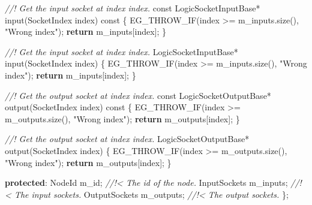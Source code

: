 \documentclass[
  12pt,
  british,
  paper=a4,
  twoside,
  titlepage=true,
  openright,
  abstract=on,
  toc=listofnumbered,
  numbers=noenddot,
  chapterprefix=true,
  headings=optiontohead,
  svgnames,
  dvipsnames]{scrreprt}
\newenvironment{Shaded}{}{}
\newcommand{\AttributeTok}[1]{\textcolor[rgb]{0.49,0.56,0.16}{#1}}
\newcommand{\CommentTok}[1]{\textcolor[rgb]{0.38,0.63,0.69}{\textit{#1}}}
\newcommand{\ControlFlowTok}[1]{\textcolor[rgb]{0.00,0.44,0.13}{\textbf{#1}}}
\newcommand{\KeywordTok}[1]{\textcolor[rgb]{0.00,0.44,0.13}{\textbf{#1}}}
\newcommand{\NormalTok}[1]{#1}
\newcommand{\OperatorTok}[1]{\textcolor[rgb]{0.40,0.40,0.40}{#1}}
\newcommand{\StringTok}[1]{\textcolor[rgb]{0.25,0.44,0.63}{#1}}
\newcommand{\VariableTok}[1]{\textcolor[rgb]{0.10,0.09,0.49}{#1}}
\begin{document}
\begin{Shaded}
\begin{Highlighting}[numbers=left,,]
    \CommentTok{//! Get the input socket at index \textasciigrave{}index\textasciigrave{}.}
    \AttributeTok{const}\NormalTok{ LogicSocketInputBase}\OperatorTok{*}\NormalTok{ input}\OperatorTok{(}\NormalTok{SocketIndex index}\OperatorTok{)} \AttributeTok{const}
    \OperatorTok{\{}
\NormalTok{        EG\_THROW\_IF}\OperatorTok{(}\NormalTok{index }\OperatorTok{\textgreater{}=} \VariableTok{m\_inputs}\OperatorTok{.}\NormalTok{size}\OperatorTok{(),} \StringTok{"Wrong index"}\OperatorTok{);}
        \ControlFlowTok{return} \VariableTok{m\_inputs}\OperatorTok{[}\NormalTok{index}\OperatorTok{];}
    \OperatorTok{\}}

    \CommentTok{//! Get the input socket at index \textasciigrave{}index\textasciigrave{}.}
\NormalTok{    LogicSocketInputBase}\OperatorTok{*}\NormalTok{ input}\OperatorTok{(}\NormalTok{SocketIndex index}\OperatorTok{)}
    \OperatorTok{\{}
\NormalTok{        EG\_THROW\_IF}\OperatorTok{(}\NormalTok{index }\OperatorTok{\textgreater{}=} \VariableTok{m\_inputs}\OperatorTok{.}\NormalTok{size}\OperatorTok{(),} \StringTok{"Wrong index"}\OperatorTok{);}
        \ControlFlowTok{return} \VariableTok{m\_inputs}\OperatorTok{[}\NormalTok{index}\OperatorTok{];}
    \OperatorTok{\}}

    \CommentTok{//! Get the output socket at index \textasciigrave{}index\textasciigrave{}.}
    \AttributeTok{const}\NormalTok{ LogicSocketOutputBase}\OperatorTok{*}\NormalTok{ output}\OperatorTok{(}\NormalTok{SocketIndex index}\OperatorTok{)} \AttributeTok{const}
    \OperatorTok{\{}
\NormalTok{        EG\_THROW\_IF}\OperatorTok{(}\NormalTok{index }\OperatorTok{\textgreater{}=} \VariableTok{m\_outputs}\OperatorTok{.}\NormalTok{size}\OperatorTok{(),} \StringTok{"Wrong index"}\OperatorTok{);}
        \ControlFlowTok{return} \VariableTok{m\_outputs}\OperatorTok{[}\NormalTok{index}\OperatorTok{];}
    \OperatorTok{\}}

    \CommentTok{//! Get the output socket at index \textasciigrave{}index\textasciigrave{}.}
\NormalTok{    LogicSocketOutputBase}\OperatorTok{*}\NormalTok{ output}\OperatorTok{(}\NormalTok{SocketIndex index}\OperatorTok{)}
    \OperatorTok{\{}
\NormalTok{        EG\_THROW\_IF}\OperatorTok{(}\NormalTok{index }\OperatorTok{\textgreater{}=} \VariableTok{m\_outputs}\OperatorTok{.}\NormalTok{size}\OperatorTok{(),} \StringTok{"Wrong index"}\OperatorTok{);}
        \ControlFlowTok{return} \VariableTok{m\_outputs}\OperatorTok{[}\NormalTok{index}\OperatorTok{];}
    \OperatorTok{\}}

\KeywordTok{protected}\OperatorTok{:}
\NormalTok{    NodeId }\VariableTok{m\_id}\OperatorTok{;}              \CommentTok{//!\textless{} The id of the node.}
\NormalTok{    InputSockets }\VariableTok{m\_inputs}\OperatorTok{;}    \CommentTok{//!\textless{} The input sockets.}
\NormalTok{    OutputSockets }\VariableTok{m\_outputs}\OperatorTok{;}  \CommentTok{//!\textless{} The output sockets.}
\OperatorTok{\};}
\end{Highlighting}
\end{Shaded}
\end{document}
